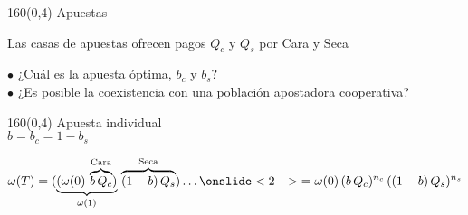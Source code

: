 \documentclass[shownotes,aspectratio=169]{beamer}
\begin{document}
\begin{frame}[plain]
\begin{textblock}{160}(0,4)
 \centering \LARGE Apuestas
\end{textblock}
\vspace{1cm}

Las casas de apuestas ofrecen pagos $Q_c$ y $Q_s$ por Cara y Seca

\vspace{1cm} \pause

$\bullet$ ¿Cuál es la apuesta óptima, $b_c$ y $b_s$? \\ \pause
$\bullet$ ¿Es posible la coexistencia con una población apostadora cooperativa?

\end{frame}





\begin{frame}[plain]
\begin{textblock}{160}(0,4)
 \centering \LARGE Apuesta individual \\
 \Large $b = b_c = 1 - b_s$
\end{textblock}
\vspace{1.5cm} 

\begin{equation*}
\omega(T) = (\underbrace{(\omega(0) \, \overbrace{b \,  Q_c}^{\text{Cara}})}_{\omega(1)} \, \overbrace{(1-b) \, Q_s}^{\text{Seca}}) \dots \onslide<2->{= \omega(0) \,  (b \,  Q_c)^{n_c}  \,  ((1-b) \, Q_s)^{n_s}}
\end{equation*}


\end{frame}
\end{document}
